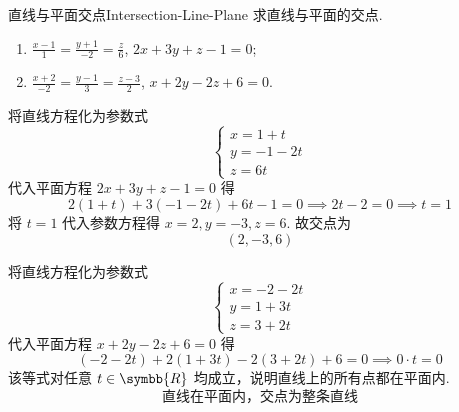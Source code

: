 \begin{problem}{直线与平面交点}{Intersection-Line-Plane}
    求直线与平面的交点.
    \begin{enumerate}
        \item $\frac{x-1}{1} = \frac{y+1}{-2} = \frac{z}{6}$, $2x + 3y + z - 1 = 0$;
        \item $\frac{x+2}{-2} = \frac{y-1}{3} = \frac{z-3}{2}$, $x + 2y - 2z + 6 = 0$.
    \end{enumerate}
\end{problem}

\begin{solution}
    将直线方程化为参数式
    \begin{equation}
        \begin{cases} x = 1 + t \\ y = -1 - 2t \\ z = 6t \end{cases}
    \end{equation}
    代入平面方程 $2x + 3y + z - 1 = 0$ 得
    \begin{equation}
        2(1 + t) + 3(-1 - 2t) + 6t - 1 = 0 \implies 2t - 2 = 0 \implies t = 1
    \end{equation}
    将 $t = 1$ 代入参数方程得 $x = 2, y = -3, z = 6$. 故交点为
    \begin{equation}
        \boxed{(2, -3, 6)}
    \end{equation}

    将直线方程化为参数式
    \begin{equation}
        \begin{cases} x = -2 - 2t \\ y = 1 + 3t \\ z = 3 + 2t \end{cases}
    \end{equation}
    代入平面方程 $x + 2y - 2z + 6 = 0$ 得
    \begin{equation}
        (-2 - 2t) + 2(1 + 3t) - 2(3 + 2t) + 6 = 0 \implies 0 \cdot t = 0
    \end{equation}
    该等式对任意 $t \in \symbb{R}$ 均成立，说明直线上的所有点都在平面内.
    \begin{equation}
        \boxed{\text{直线在平面内，交点为整条直线}}
    \end{equation}
\end{solution}



